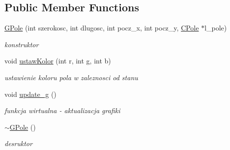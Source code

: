 \subsection*{Public Member Functions}
\begin{DoxyCompactItemize}
\item 
\mbox{\label{class_g_pole_a6271a0682e90addaae1dae8374577a7f}} 
\mbox{\hyperlink{class_g_pole_a6271a0682e90addaae1dae8374577a7f}{G\+Pole}} (int szerokosc, int dlugosc, int pocz\+\_\+x, int pocz\+\_\+y, \mbox{\hyperlink{class_c_pole}{C\+Pole}} $\ast$l\+\_\+pole)
\begin{DoxyCompactList}\small\item\em konstruktor \end{DoxyCompactList}\item 
\mbox{\label{class_g_pole_a2375fa9d5ddccaf2a0d2827b6559753b}} 
void \mbox{\hyperlink{class_g_pole_a2375fa9d5ddccaf2a0d2827b6559753b}{ustaw\+Kolor}} (int r, int g, int b)
\begin{DoxyCompactList}\small\item\em ustawienie koloru pola w zaleznosci od stanu \end{DoxyCompactList}\item 
\mbox{\label{class_g_pole_abbec0a51dfb406a5e101c3d64bde7545}} 
void \mbox{\hyperlink{class_g_pole_abbec0a51dfb406a5e101c3d64bde7545}{update\+\_\+g}} ()
\begin{DoxyCompactList}\small\item\em funkcja wirtualna -\/ aktualizacja grafiki \end{DoxyCompactList}\item 
\mbox{\label{class_g_pole_a90c213d200c702a9780407a777d14456}} 
\mbox{\hyperlink{class_g_pole_a90c213d200c702a9780407a777d14456}{$\sim$\+G\+Pole}} ()
\begin{DoxyCompactList}\small\item\em desruktor \end{DoxyCompactList}\end{DoxyCompactItemize}
